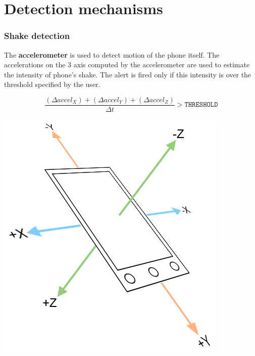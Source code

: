 \documentclass{beamer}
\begin{document}
\section{Detection mechanisms}
\begin{frame}
\frametitle{Shake detection}
\begin{block}{}
The \textbf{accelerometer} is used to detect motion of the phone itself. The accelerations on the 3 axis computed by the accelerometer are used to estimate the intensity of phone's shake. The alert is fired only if this intensity is over the threshold specified by the user.
\end{block}
\begin{minipage}[c]{.7\textwidth}
{\footnotesize\[\frac{(\Delta accel_X) + (\Delta accel_Y) + (\Delta accel_Z)}{\Delta t} > \texttt{THRESHOLD}\]}
\end{minipage}\begin{minipage}[c]{.25\textwidth}
\includegraphics[scale=.3]{./../ipermediali/img/accelerometer.png}
\end{minipage}
\end{frame}
\end{document}
